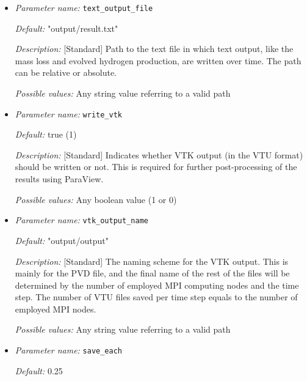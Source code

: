 \begin{itemize}
\item {\it Parameter name:} {\tt text\_output\_file}
\label{parameters:text_output_file}


{\it Default:} "output/result.txt"

{\it Description:} [Standard] Path to the text file in which text output, like the mass loss and evolved hydrogen production, are written over time. The path can be relative or absolute.

{\it Possible values:} Any string value referring to a valid path


\item {\it Parameter name:} {\tt write\_vtk}
\label{parameters:write_vtk}


{\it Default:} true (1)

{\it Description:} [Standard] Indicates whether VTK output (in the VTU format) should be written or not. This is required for further post-processing of the results using ParaView.

{\it Possible values:} Any boolean value (1 or 0)


\item {\it Parameter name:} {\tt vtk\_output\_name}
\label{parameters:vtk_output_name}


{\it Default:} "output/output"

{\it Description:} [Standard] The naming scheme for the VTK output. This is mainly for the PVD file, and the final name of the rest of the files will be determined by the number of employed MPI computing nodes and the time step. The number of VTU files saved per time step equals to the number of employed MPI nodes.

{\it Possible values:} Any string value referring to a valid path


\item {\it Parameter name:} {\tt save\_each}
\label{parameters:save_each}


{\it Default:} 0.25


\end{itemize}
